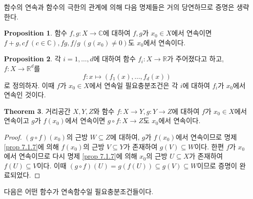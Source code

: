 \documentclass[11pt]{book}
\numberwithin{equation}{chapter}
\def\RR{\mathbb{R}}
\def\CC{\mathbb{C}}
\theoremstyle{definition}
\newtheorem{thm}{Theorem}[section]
\newtheorem{prop}[thm]{Proposition}
\begin{document}
함수의 연속과 함수의 극한의 관계에 의해 다음 명제들은 거의 당연하므로 증명은 생략한다.

\begin{prop}
    함수 \(f, g : X \to \CC\)에 대하여 \(f, g\)가 \(x_0 \in X\)에서 연속이면 \(f+g, cf \ (c \in \CC), fg, f/g \ (g(x_0) \ne 0)\)도 \(x_0\)에서 연속이다.
\end{prop}

\begin{prop}
    각 \(i = 1, \ldots, d\)에 대하여 함수 \(f_i : X \to \RR\)가 주어졌다고 하고, \(f : X \to \RR^d\)를
    \[
    f : x \mapsto (f_1(x), \ldots, f_d(x))    
    \]
    로 정의하자. 이때 \(f\)가 \(x_0 \in X\)에서 연속일 필요충분조건은 각 \(i\)에 대하여 \(f_i\)가 \(x_0\)에서 연속인 것이다.
\end{prop}

\begin{thm}
    거리공간 \(X, Y, Z\)와 함수 \(f : X \to Y, g : Y \to Z\)에 대하여 \(f\)가 \(x_0 \in X\)에서 연속이고 \(g\)가 \(f(x_0)\)에서 연속이면 \(g \circ f : X \to Z\)도 \(x_0\)에서 연속이다.
\end{thm}
\begin{proof}
    \((g \circ f)(x_0)\)의 근방 \(W \subseteq Z\)에 대하여, \(g\)가 \(f(x_0)\)에서 연속이므로 명제 \ref{prop 7.1.7}에 의해 \(f(x_0)\)의 근방 \(V \subseteq Y\)가 존재하여 \(g(V) \subseteq W\)이다. 한편 \(f\)가 \(x_0\)에서 연속이므로 다시 명제 \ref{prop 7.1.7}에 의해 \(x_0\)의 근방 \(U \subseteq X\)가 존재하여 \(f(U) \subseteq V\)이다. 이때 \((g \circ f)(U) = g(f(U)) \subseteq g(V) \subseteq W\)이므로 증명이 완료되었다.
\end{proof}

다음은 어떤 함수가 연속함수일 필요충분조건들이다.
\end{document}
